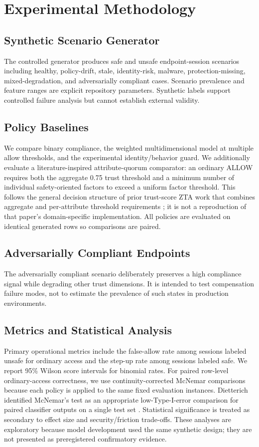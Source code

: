 \documentclass[journal]{IEEEtran}
\begin{document}
\section{Experimental Methodology}
\subsection{Synthetic Scenario Generator}
The controlled generator produces safe and unsafe endpoint-session scenarios including
healthy, policy-drift, stale, identity-risk, malware, protection-missing,
mixed-degradation, and adversarially compliant cases. Scenario prevalence and feature
ranges are explicit repository parameters. Synthetic labels support controlled failure
analysis but cannot establish external validity.

\subsection{Policy Baselines}
We compare binary compliance, the weighted multidimensional model at multiple allow
thresholds, and the experimental identity/behavior guard. We additionally evaluate a
literature-inspired attribute-quorum comparator: an ordinary ALLOW requires both the
aggregate 0.75 trust threshold and a minimum number of individual safety-oriented
factors to exceed a uniform factor threshold. This follows the general decision
structure of prior trust-score ZTA work that combines aggregate and per-attribute
threshold requirements \cite{bhattarai2024ami}; it is not a reproduction of that
paper's domain-specific implementation. All policies are evaluated on identical
generated rows so comparisons are paired.

\subsection{Adversarially Compliant Endpoints}
The adversarially compliant scenario deliberately preserves a high compliance signal
while degrading other trust dimensions. It is intended to test compensation failure
modes, not to estimate the prevalence of such states in production environments.

\subsection{Metrics and Statistical Analysis}
Primary operational metrics include the false-allow rate among sessions labeled unsafe
for ordinary access and the step-up rate among sessions labeled safe. We report 95\%
Wilson score intervals for binomial rates. For paired row-level ordinary-access
correctness, we use continuity-corrected McNemar comparisons because each policy is
applied to the same fixed evaluation instances. Dietterich identified McNemar's test as
an appropriate low-Type-I-error comparison for paired classifier outputs on a single
test set \cite{dietterich1998statistical}. Statistical significance is treated as
secondary to effect size and security/friction trade-offs. These analyses are
exploratory because model development used the same synthetic design; they are not
presented as preregistered confirmatory evidence.
\end{document}
